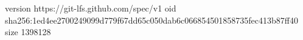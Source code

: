 version https://git-lfs.github.com/spec/v1
oid sha256:1ed4ee2700249099d779f67dd65c050dab6c066854501858735fec413b87ff40
size 1398128

